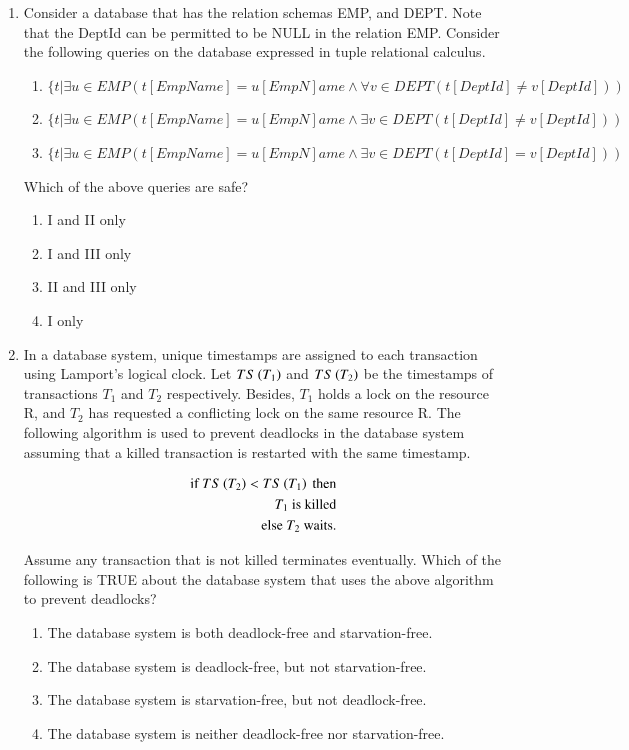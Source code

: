 \documentclass[a4paper, 11pt]{article}
\begin{document}
\begin{enumerate}
    \item Consider a database that has the relation schemas EMP, and DEPT. Note that the DeptId can be permitted to be NULL in the relation EMP. Consider the following queries on the database expressed in tuple relational calculus.
    \begin{enumerate}[label=\Roman*]
            \item $\{t|\exists u\in EMP(t[EmpName]=u[EmpN]ame\wedge\forall v\in DEPT(t[DeptId]\ne v[DeptId]))$
            \item $\{t|\exists u\in EMP(t[EmpName]=u[EmpN]ame\wedge\exists v\in DEPT(t[DeptId]\ne v[DeptId]))$
            \item $\{t|\exists u\in EMP(t[EmpName]=u[EmpN]ame\wedge\exists v\in DEPT(t[DeptId]= v[DeptId]))$
    \end{enumerate}    
    Which of the above queries are safe?
    \begin{enumerate}
        \item I and II only
        \item I and III only
        \item II and III only
        \item I only
    \end{enumerate}
    
    \hfill{}

    \item In a database system, unique timestamps are assigned to each transaction using Lamport's logical clock. Let $TS\brak{T_1}$ and $TS\brak{T_2}$ be the timestamps of transactions $T_1$ and $T_2$ respectively. Besides, $T_1$ holds a lock on the resource R, and $T_2$ has requested a conflicting lock on the same resource R. The following algorithm is used to prevent deadlocks in the database system assuming that a killed transaction is restarted with the same timestamp.
    
    \begin{align*}
        \text{if } TS\brak{T_2} < TS\brak{T_1} \text{ then} \\
        T_1 \text{ is killed} \\
        \text{else } T_2 \text{ waits.}
    \end{align*}
    
    Assume any transaction that is not killed terminates eventually. Which of the following is TRUE about the database system that uses the above algorithm to prevent deadlocks?
    \begin{enumerate}
        \item The database system is both deadlock-free and starvation-free.
        \item The database system is deadlock-free, but not starvation-free.
        \item The database system is starvation-free, but not deadlock-free.
        \item The database system is neither deadlock-free nor starvation-free.
    \end{enumerate}


\end{enumerate}
\end{document}
